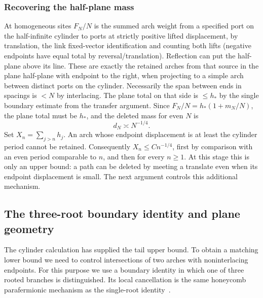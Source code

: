 \subsubsection{Recovering the half-plane mass}
At homogeneous sites \(F_N/N\) is the summed arch weight from a specified port on the half-infinite cylinder to ports at strictly positive lifted displacement, by translation, the link fixed-vector identification and counting both lifts (negative endpoints have equal total by reversal/translation). Reflection can put the half-plane above its line. These are exactly the retained arches from that source in the plane half-plane with endpoint to the right, when projecting to a simple arch between distinct ports on the cylinder. Necessarily the span between ends in spacings is \(<N\) by interlacing. The plane total on that side is \(\le h_*\) by the single boundary estimate from the transfer argument. Since \(F_N/N=h_*(1+m_N/N)\), the plane total must be \(h_*\), and the deleted mass for even \(N\) is
\begin{equation}
             d_N\asymp N^{-1/4}.                                   \label{c4:BD}
\end{equation}
Set $X_n=\sum_{j>n}h_j$. An arch whose endpoint displacement
is at least the cylinder period cannot be retained. Consequently
$X_n\le Cn^{-1/4}$, first by comparison with an even period comparable to
$n$, and then for every $n\ge1$. At this stage this is only an upper
bound: a path can be deleted by meeting a translate even when its
endpoint displacement is small. The next argument controls this
additional mechanism.

\subsection{The three-root boundary identity and plane geometry}\label{c4:boundary-geometry}

The cylinder calculation has supplied the tail upper bound. To obtain a
matching lower bound we need to control intersections of two arches with
noninterlacing endpoints. For this purpose we use a boundary identity in
which one of three rooted branches is distinguished. Its local
cancellation is the same honeycomb parafermionic mechanism as the
single-root identity~\cite{DuminilCopinSmirnov2012}.

